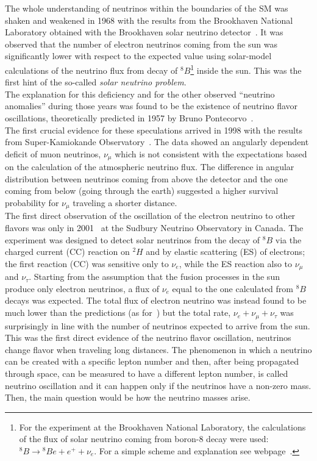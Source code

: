 The whole understanding of neutrinos within the boundaries of the SM was shaken and weakened in 1968 with the results from the Brookhaven National Laboratory obtained with the Brookhaven solar neutrino detector~\cite{PhysRevLett.20.1205}.
It was observed that the number of electron neutrinos coming from the sun was significantly lower with respect to the expected value using solar-model calculations of the neutrino flux from decay of ${}^{8}B$\footnote{For the experiment at the Brookhaven National Laboratory, the calculations of the flux of solar neutrino coming from boron-8 decay were used: ${}^{8}B\rightarrow {}^{8}Be + e^{+} + \nu_e$. For a simple scheme and explanation see webpage~\cite{webpage_boron}.} inside the sun. This was the first hint of the so-called \emph{solar neutrino problem}.\\
The explanation for this deficiency and for the other observed ``neutrino anomalies'' during those years was found to be the existence of neutrino flavor oscillations, theoretically predicted in 1957 by Bruno Pontecorvo~\cite{osti_4343073}. \\
The first crucial evidence for these speculations arrived in 1998 with the results from Super-Kamiokande Observatory~\cite{Fukuda_1998}. The data showed an angularly dependent deficit of muon neutrinos, $\nu_{\mu}$ which is not consistent with the expectations based on the calculation of the atmospheric neutrino flux. The difference in angular distribution between neutrinos coming from above the detector and the one coming from below (going through the earth) suggested a higher survival probability for $\nu_{\mu}$ traveling a shorter distance.\\
The first direct observation of the oscillation of the electron neutrino to other flavors was only in 2001~\cite{Ahmad_2001} at the Sudbury Neutrino Observatory in Canada. The experiment was designed to detect solar neutrinos from the decay of ${}^{8}B$ via the charged current (CC) reaction on ${}^{2}H$ and by elastic scattering (ES) of electrons; the first reaction (CC) was sensitive only to $\nu_e$, while the ES reaction also to  $\nu_{\mu}$ and $\nu_{\tau}$. Starting from the assumption that the fusion processes in the sun produce only electron neutrinos, a flux of $\nu_{e}$ equal to the one calculated from ${}^{8}B$  decays was expected. The total flux of electron neutrino was instead found to be much lower than the predictions (as for~\cite{PhysRevLett.20.1205}) but the total rate, $\nu_{e} + \nu_{\mu} + \nu_{\tau}$ was surprisingly in line with the number of neutrinos expected to arrive from the sun. This was the first direct evidence of the neutrino flavor oscillation, \ie neutrinos change flavor when traveling long distances. The phenomenon in which a neutrino can be created with a specific lepton number and then, after being propagated through space, can be measured to have a different lepton number, is called neutrino oscillation and it can happen only if the neutrinos have a non-zero mass. Then, the main question would be how the neutrino masses arise.

